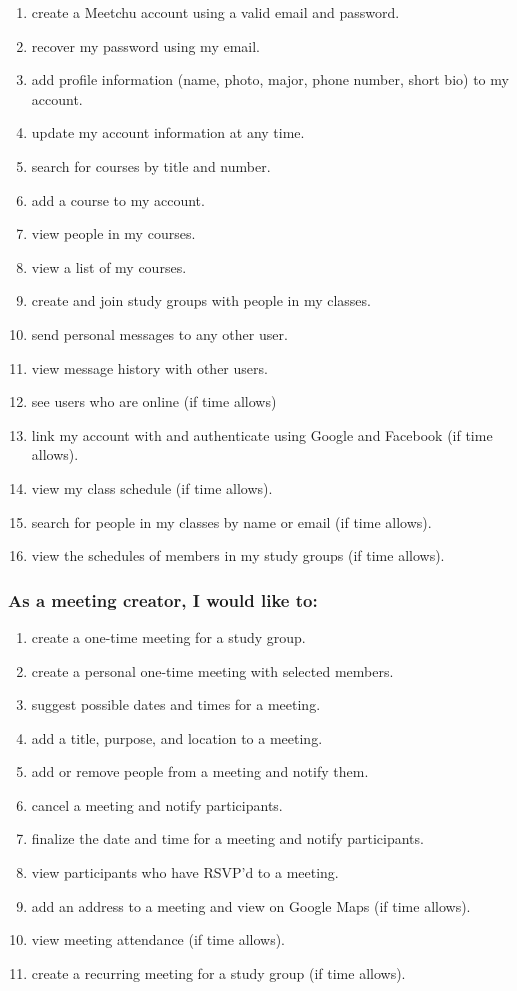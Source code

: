 \documentclass[12pt]{article}
\begin{document}
\begin{enumerate}[nolistsep]
    \item create a Meetchu account using a valid email and password.
    \item recover my password using my email.
    \item add profile information (name, photo, major, phone number, short bio) to my account.
    \item update my account information at any time.
    \item search for courses by title and number.
    \item add a course to my account.
    \item view people in my courses.
    \item view a list of my courses.
    \item create and join study groups with people in my classes.
    \item send personal messages to any other user.
    \item view message history with other users.
    \item see users who are online (if time allows)
    \item link my account with and authenticate using Google and Facebook (if time allows).
    \item view my class schedule (if time allows).
    \item search for people in my classes by name or email (if time allows).
    \item view the schedules of members in my study groups (if time allows).
\end{enumerate}
\newpage
\subsubsection*{As a meeting creator, I would like to:}

\begin{enumerate}[nolistsep]
    \item create a one-time meeting for a study group.
    \item create a personal one-time meeting with selected members.
    \item suggest possible dates and times for a meeting.
    \item add a title, purpose, and location to a meeting.
    \item add or remove people from a meeting and notify them.
    \item cancel a meeting and notify participants.
    \item finalize the date and time for a meeting and notify participants.
    \item view participants who have RSVP'd to a meeting.
    \item add an address to a meeting and view on Google Maps (if time allows).
    \item view meeting attendance (if time allows).
    \item create a recurring meeting for a study group (if time allows).
\end{enumerate}
\end{document}
